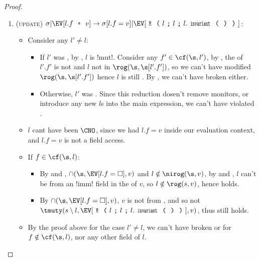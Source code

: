 \begin{proof}
\begin{enumerate}
\item (\textsc{update}) $\sigma|\EV[l.f\equals{}v]\rightarrow \sigma[l.f=v]|\EV[\M{l}{l}{l.\invariant}]$:
\begin{itemize}
\item Consider any $l' \neq l$:
\begin{itemize}
		\item If $l'$ was \CNE, by , $l$ is \Q!mut!. Consider any $f' \in \cf(\s, l')$, by \CNE, the \rog of $l'.f'$ is not \tmuty and $l$ not in $\rog(\s, \s[l'.f'])$, so we can't have modified $\rog(\s, \s[l'.f'])$ hence $l$ is still \CNC. By , we can't have broken \CNE either.
		\item Otherwise, $l'$ was \CNO. Since this reduction dosen't remove monitors, or introduce any new $l$s into the main expression, we can't have violated \CNO.
\end{itemize}
\item $l$ cant have been $\CNO$, since we had $l.f = v$ inside our evaluation context, and $l.f = v$ is not a field access.
\item If $f \in \cf(\s, l)$:
\begin{itemize} 
\item By  and , $\cap(\s, \EV[l.f = \square], v)$ and $l \notin \nirog(\s, v)$, by  and , $l$ can't be \reach from an \Q!imm! field in the \rog of $v$, so $l\notin \rog(s, v)$, hence \CNC holds.
\item By $\cap(\s, \EV[l.f = \square], v)$, $v$ is not \tmuty from \EV, and so not $\tmuty(s\setminus l, \EV[\M{l}{l}{l.\invariant}], v)$, thus \CNE still holds.
\end{itemize}
\item By the proof above for the case $l' \neq l$, we can't have broken \CNE or \CNC for $f \notin \cf(\s, l)$, nor any other field of $l$.
\end{itemize}



\end{enumerate}
\end{proof}

